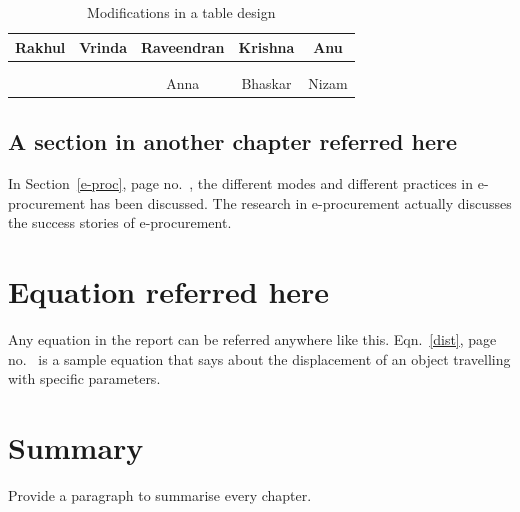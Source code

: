\begin{table}[h!]\centering \caption{Modifications in a table design}
\begin{tabular}{||c||c||c||c||c||}
\hline Rakhul & Vrinda & Raveendran & Krishna & Anu \\ 
\hline  &  &  &  &  \\ 
\hline  &  &  &  &  \\ 
\hline  &  & Anna & Bhaskar & Nizam \\ 
\hline 
\end{tabular} 
\end{table}


\subsection{A section in another chapter referred here}

In Section~\ref{e-proc}, page no.~\pageref{e-proc}, the different modes and different practices in e-procurement has been discussed. The research in e-procurement actually discusses the success stories of e-procurement.
\section{Equation referred here}

Any equation in the report can be referred anywhere like this. Eqn.~\eqref{dist}, page no.~\pageref{dist}  is a sample equation that says about the displacement of an object travelling with specific parameters. 

\section{Summary}

Provide a paragraph to summarise every chapter.